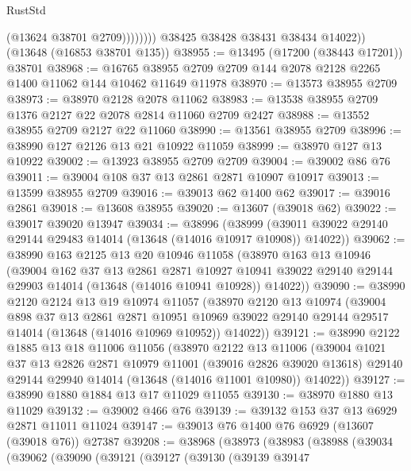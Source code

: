 \begin{lexlean}{RustStd}
\begin{coremodule}
                      (@13624 @38701 @2709))))))))
        @38425
        @38428
        @38431
        @38434
        @14022))
    (@13648 (@16853 @38701 @135))
@38955 := @13495 (@17200 (@38443 @17201)) @38701
@38968 := @16765 @38955 @2709 @2709 @144 @2078 @2128 @2265 @1400 @11062 @144 @10462 @11649 @11978
@38970 := @13573 @38955 @2709
@38973 := @38970 @2128 @2078 @11062
@38983 := @13538 @38955 @2709 @1376 @2127 @22 @2078 @2814 @11060 @2709 @2427
@38988 := @13552 @38955 @2709 @2127 @22 @11060
@38990 := @13561 @38955 @2709
@38996 := @38990 @127 @2126 @13 @21 @10922 @11059
@38999 := @38970 @127 @13 @10922
@39002 := @13923 @38955 @2709 @2709
@39004 := @39002 @86 @76
@39011 := @39004 @108 @37 @13 @2861 @2871 @10907 @10917
@39013 := @13599 @38955 @2709
@39016 := @39013 @62 @1400 @62
@39017 := @39016 @2861
@39018 := @13608 @38955
@39020 := @13607 (@39018 @62)
@39022 := @39017 @39020 @13947
@39034 := @38996
    (@38999 (@39011 @39022 @29140 @29144 @29483 @14014 (@13648 (@14016 @10917 @10908)) @14022))
@39062 := @38990
    @163
    @2125
    @13
    @20
    @10946
    @11058
    (@38970
      @163
      @13
      @10946
      (@39004
        @162
        @37
        @13
        @2861
        @2871
        @10927
        @10941
        @39022
        @29140
        @29144
        @29903
        @14014
        (@13648 (@14016 @10941 @10928))
        @14022))
@39090 := @38990
    @2120
    @2124
    @13
    @19
    @10974
    @11057
    (@38970
      @2120
      @13
      @10974
      (@39004
        @898
        @37
        @13
        @2861
        @2871
        @10951
        @10969
        @39022
        @29140
        @29144
        @29517
        @14014
        (@13648 (@14016 @10969 @10952))
        @14022))
@39121 := @38990
    @2122
    @1885
    @13
    @18
    @11006
    @11056
    (@38970
      @2122
      @13
      @11006
      (@39004
        @1021
        @37
        @13
        @2826
        @2871
        @10979
        @11001
        (@39016 @2826 @39020 @13618)
        @29140
        @29144
        @29940
        @14014
        (@13648 (@14016 @11001 @10980))
        @14022))
@39127 := @38990 @1880 @1884 @13 @17 @11029 @11055
@39130 := @38970 @1880 @13 @11029
@39132 := @39002 @466 @76
@39139 := @39132 @153 @37 @13 @6929 @2871 @11011 @11024
@39147 := @39013 @76 @1400 @76 @6929 (@13607 (@39018 @76)) @27387
@39208 := @38968
    (@38973
      (@38983
        (@38988
          (@39034
            (@39062
              (@39090
                (@39121
                  (@39127
                    (@39130
                      (@39139
                        @39147

\end{coremodule}
\end{lexlean}
